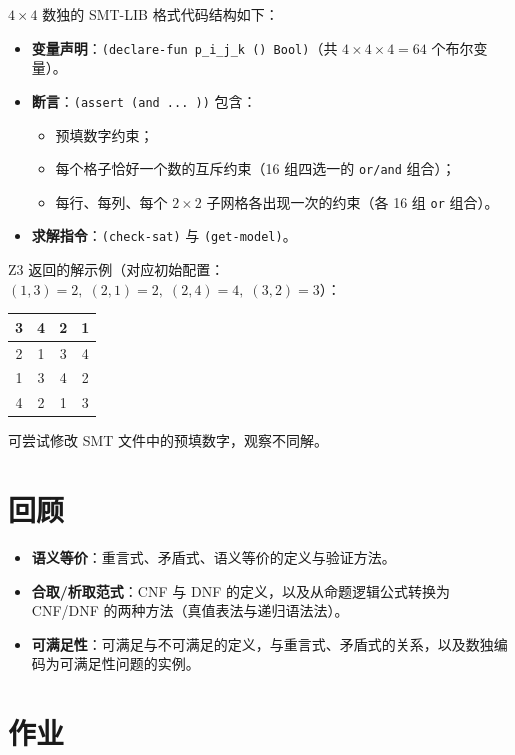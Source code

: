 \documentclass[UTF8,11pt,a4paper]{ctexbook}   %
\theoremstyle{definition}
\begin{document}
$4 \times 4$ 数独的 SMT-LIB 格式代码结构如下：
\begin{itemize}
    \item \textbf{变量声明}：\texttt{(declare-fun p\_i\_j\_k () Bool)}（共 $4 \times 4 \times 4 = 64$ 个布尔变量）。
    \item \textbf{断言}：\texttt{(assert (and ... ))} 包含：
    \begin{itemize}
        \item 预填数字约束；
        \item 每个格子恰好一个数的互斥约束（16 组四选一的 \texttt{or/and} 组合）；
        \item 每行、每列、每个 $2 \times 2$ 子网格各出现一次的约束（各 16 组 \texttt{or} 组合）。
    \end{itemize}
    \item \textbf{求解指令}：\texttt{(check-sat)} 与 \texttt{(get-model)}。
\end{itemize}

Z3 返回的解示例（对应初始配置：$(1,3)=2,\; (2,1)=2,\; (2,4)=4,\; (3,2)=3$）：

\begin{table}[htbp]
\centering
\begin{tabular}{|c|c|c|c|}
\hline
3 & 4 & 2 & 1 \\
\hline
2 & 1 & 3 & 4 \\
\hline
1 & 3 & 4 & 2 \\
\hline
4 & 2 & 1 & 3 \\
\hline
\end{tabular}
\end{table}

可尝试修改 SMT 文件中的预填数字，观察不同解。

\section{回顾}

\begin{itemize}
    \item \textbf{语义等价}：重言式、矛盾式、语义等价的定义与验证方法。
    \item \textbf{合取/析取范式}：CNF 与 DNF 的定义，以及从命题逻辑公式转换为 CNF/DNF 的两种方法（真值表法与递归语法法）。
    \item \textbf{可满足性}：可满足与不可满足的定义，与重言式、矛盾式的关系，以及数独编码为可满足性问题的实例。
\end{itemize}

\section{作业}
\end{document}
